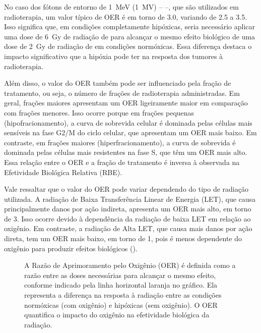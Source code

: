 \documentclass[11pt,a4paper]{article}
\begin{document}
	No caso dos fótons de entorno de \SI{1}{\mega\electronvolt} (\SI{1}{\mega\volt}) --  --, que são utilizados em radioterapia, um valor típico de OER é em torno de 3.0, variando de 2.5 a 3.5. Isso significa que, em condições completamente hipóxicas, seria necessário aplicar uma dose de \SI{6}{\gray} de radiação de  para alcançar o mesmo efeito biológico de uma dose de \SI{2}{\gray} de radiação de  em condições normóxicas. Essa diferença destaca o impacto significativo que a hipóxia pode ter na resposta dos tumores à radioterapia.

	Além disso, o valor do OER também pode ser influenciado pela fração de tratamento, ou seja, o número de frações de radioterapia administradas. Em geral, frações maiores apresentam um OER ligeiramente maior em comparação com frações menores. Isso ocorre porque em frações pequenas (hipofracionamento), a curva de sobrevida celular é dominada pelas células mais sensíveis na fase G2/M do ciclo celular, que apresentam um OER mais baixo. Em contraste, em frações maiores (hiperfracionamento), a curva de sobrevida é dominada pelas células mais resistentes na fase S, que têm um OER mais alto. Essa relação entre o OER e a fração de tratamento é inversa à observada na Efetividade Biológica Relativa (RBE).

	Vale ressaltar que o valor do OER pode variar dependendo do tipo de radiação utilizada. A radiação de Baixa Transferência Linear de Energia (LET), que causa principalmente danos por ação indireta, apresenta um OER mais alto, em torno de 3. Isso ocorre devido à dependência da radiação de baixa LET em relação ao oxigênio. Em contraste, a radiação de Alta LET, que causa mais danos por ação direta, tem um OER mais baixo, em torno de 1, pois é menos dependente do oxigênio para produzir efeitos biológicos (). 

	\begin{figure}[h]
		\centering
		\caption{A Razão de Aprimoramento pelo Oxigênio (OER) é definida como a razão entre as doses necessárias para alcançar o mesmo efeito, conforme indicado pela linha horizontal laranja no gráfico. Ela representa a diferença na resposta à radiação entre as condições normóxicas (com oxigênio) e hipóxicas (sem oxigênio). O OER quantifica o impacto do oxigênio na efetividade biológica da radiação.}
		\label{fig:}
	\end{figure}
\end{document}
